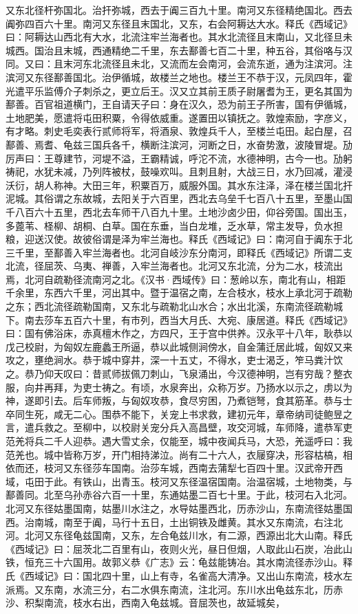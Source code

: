 \documentclass[12pt,UTF8]{ctexbook}
\begin{document}
又东北径杆弥国北。治扞弥城，西去于阗三百九十里。南河又东径精绝国北。西去阗弥四百六十里。南河又东径且末国北，又东，右会阿耨达大水。释氏《西域记》曰：阿耨达山西北有大水，北流注牢兰海者也。其水北流径且末南山，又北径旦未城西。国治且末城，西通精绝二千里，东去鄯善七百二十里，种五谷，其俗咯与汉同。又曰：且末河东北流径且未北，又流而左会南河，会流东逝，通为注滨河。注滨河又东径鄯善国北。治伊循城，故楼兰之地也。楼兰王不恭于汉，元凤四年，霍光遣平乐监傅介子刺杀之，更立后王。汉又立其前王质子尉屠耆为王，更名其国为鄯善。百官祖道横门，王自请天子曰：身在汉久，恐为前王子所害，国有伊循城，土地肥美，愿遣将屯田积粟，令得依威重。遂置田以镇抚之。敦煌索励，字彦义，有才略。刺史毛奕表行贰师将军，将酒泉、敦煌兵千人，至楼兰屯田。起白屋，召鄯善、焉耆、龟兹三国兵各千，横断注滨河，河断之日，水奋势激，波陵冒堤。劢厉声曰：王尊建节，河堤不溢，王霸精诚，呼沱不流，水德神明，古今一也。劢躬祷祀，水犹未减，乃列阵被杖，鼓噪欢叫。且刺且射，大战三日，水乃回减，灌浸沃衍，胡人称神。大田三年，积粟百万，威服外国。其水东注泽，泽在楼兰国北扞泥城。其俗谓之东故城，去阳关于六百里，西北去乌垒千七百八十五里，至墨山国千八百六十五里，西北去车师干八百九十里。土地沙卤少田，仰谷旁国。国出玉，多蓖苇、柽柳、胡桐、白草。国在东垂，当白龙堆，乏水草，常主发导，负水担粮，迎送汉使。故彼俗谓是泽为牢兰海也。释氏《西域记》曰：南河自于阗东于北三千里，至鄯善入牢兰海者也。北河自岐沙东分南河，即释氏《西域记》所谓二支北流，径屈茨、乌夷、禅善，入牢兰海者也。北河又东北流，分为二水，枝流出焉，北河自疏勒径流南河之北。《汉书·西域传》曰：葱岭以东，南北有山，相距千余里，东西六千里，河出其中。暨于温宿之南，左合枝水，枝水上承北河于疏勒之东；西北流径疏勒国南，又东北与疏勒北山水合；水出北溪，东南流径疏勒城下。南去莎车五百六十里，有市列，西当大月氏、大宛、康居道。释氏《西域记》曰：国有佛浴床，赤真檀木作之，方四尺，王于宫中供养。汉永平十八年，耿恭以戊己校尉，为匈奴左鹿蠡王所逼，恭以此城侧涧傍水，自金蒲迁居此城，匈奴又来攻之，壅绝涧水。恭于城中穿井，深一十五丈，不得水，吏士渴乏，笮马粪汁饮之。恭乃仰天叹曰：昔贰师拔佩刀刺山，飞泉涌出，今汉德神明，岂有穷哉？整衣服，向井再拜，为吏士祷之。有顷，水泉奔出，众称万岁。乃扬水以示之，虏以为神，遂即引去。后车师叛，与匈奴攻恭，食尽穷困，乃煮铠弩，食其筋革。恭与士卒同生死，咸无二心。围恭不能下，关宠上书求救，建初元年，章帝纳司徒鲍昱之言，遣兵救之。至柳中，以校尉关宠分兵入高昌壁，攻交河城，车师降，遣恭军吏范羌将兵二千人迎恭。遇大雪丈余，仅能至，城中夜闻兵马，大恐，羌遥呼曰：我范羌也。城中皆称万岁，开门相持涕泣。尚有二十六人，衣屦穿决，形容枯槁，相依而还，枝河又东径莎车国南。治莎车城，西南去蒲犁七百四十里。汉武帝开西域，屯田于此。有铁山，出青玉。枝河又东径温宿国南。治温宿城，土地物类，与鄯善同。北至乌孙赤谷六百一十里，东通姑墨二百七十里。于此，枝河右入北河。北河又东径姑墨国南，姑墨川水注之，水导姑墨西北，历赤沙山，东南流径姑墨国西。治南城，南至于阗，马行十五日，土出铜铁及雌黄。其水又东南流，右注北河。北河又东径龟兹国南，又东，左合龟兹川水，有二源，西源出北大山南。释氏《西域记》曰：屈茨北二百里有山，夜则火光，昼日但烟，人取此山石炭，冶此山铁，恒充三十六国用。故郭义恭《广志》云：龟兹能铸冶。其水南流径赤沙山。释氏《西域记》曰：国北四十里，山上有寺，名雀高大清净。又出山东南流，枝水左派焉。又东南，水流三分，右二水俱东南流，注北河。东川水出龟兹东北，历赤沙、积梨南流，枝水右出，西南入龟兹城。音屈茨也，故延城矣，
\end{document}

